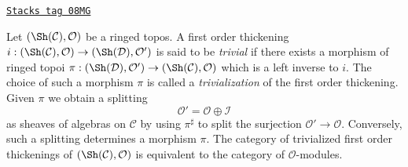 \begin{remark}
\label{defos-remark-trivial-thickening-ringed-topoi}
\href{https://stacks.math.columbia.edu/tag/08MG}{\texttt{Stacks tag 08MG}}

Let $(\Sh(\mathcal{C}), \mathcal{O})$ be a ringed topos. A first order
thickening $i : (\Sh(\mathcal{C}), \mathcal{O}) \to
(\Sh(\mathcal{D}), \mathcal{O}')$ is said
to be {\it trivial} if there exists a morphism of ringed topoi
$\pi : (\Sh(\mathcal{D}), \mathcal{O}') \to (\Sh(\mathcal{C}), \mathcal{O})$
which is a left inverse to $i$. The choice of such a morphism
$\pi$ is called a {\it trivialization} of the first order thickening.
Given $\pi$ we obtain a splitting
\begin{equation}
\label{equation-splitting-ringed-topoi}
\mathcal{O}' = \mathcal{O} \oplus \mathcal{I}
\end{equation}
as sheaves of algebras on $\mathcal{C}$ by using $\pi^\sharp$
to split the surjection $\mathcal{O}' \to \mathcal{O}$.
Conversely, such a splitting determines
a morphism $\pi$. The category of trivialized first order thickenings of
$(\Sh(\mathcal{C}), \mathcal{O})$ is equivalent to the category of
$\mathcal{O}$-modules.
\end{remark}

